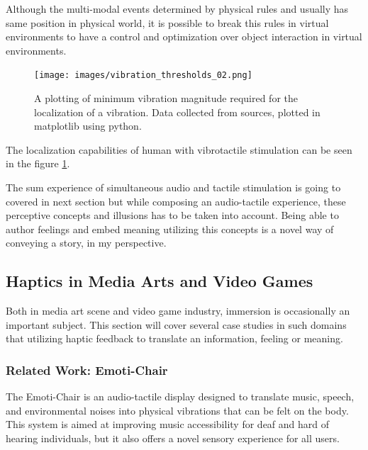             Although the multi-modal events determined by physical rules and usually has same position in physical world, it is possible to break this rules in virtual environments to have a control and optimization over object interaction in virtual environments.

            \begin{figure}[H]
                \centering
                \texttt{[image: images/vibration\_thresholds\_02.png]}
                \caption{A plotting of minimum vibration magnitude required for the localization of a vibration. Data collected from sources\cite{Haptic_Perception-A_Tutorial}, plotted in matplotlib using python.}
                \label{fig:VIB_THRESHOLD_02}
            \end{figure}            

            The localization capabilities of human with vibrotactile stimulation can be seen in the figure \ref{fig:VIB_THRESHOLD_02}.

            The sum experience of simultaneous audio and tactile stimulation is going to covered in next section but while composing an audio-tactile experience, these perceptive concepts and illusions has to be taken into account. Being able to author feelings and embed meaning utilizing this concepts is a novel way of conveying a story, in my perspective.\par
        \subsection{Haptics in Media Arts and Video Games}
            Both in media art scene and video game industry, immersion is occasionally an important subject. This section will cover several case studies in such domains that utilizing haptic feedback to translate an information, feeling or meaning.\par

            \subsubsection{Related Work: Emoti-Chair}
                The Emoti-Chair is an audio-tactile display designed to translate music, speech, and environmental noises into physical vibrations that can be felt on the body. This system is aimed at improving music accessibility for deaf and hard of hearing individuals, but it also offers a novel sensory experience for all users\cite{Emoti-Chair}.\par

